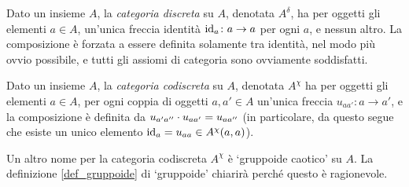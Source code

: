 \begin{example}\label{ex_cat_discreta}
 Dato un insieme \(A\), la \emph{categoria discreta} su \(A\), denotata \(A^\delta\), ha per oggetti gli elementi \(a\in A\), un'unica freccia identità \(\mathrm{id}_a \colon a\to a\) per ogni \(a\), e nessun altro. La composizione è forzata a essere definita solamente tra identità, nel modo più ovvio possibile, e tutti gli assiomi di categoria sono ovviamente soddisfatti.
\end{example}
\begin{example}\label{ex_cat_codiscreta}
 Dato un insieme \(A\), la \emph{categoria codiscreta} su \(A\), denotata \(A^\chi\) ha per oggetti gli elementi \(a\in A\), per ogni coppia di oggetti \(a,a'\in A\) un'unica freccia \(u_{aa'}\colon a\to a'\), e la composizione è definita da \(u_{a'a''}\cdot u_{aa'}=u_{aa''}\) (in particolare, da questo segue che esiste un unico elemento \(\mathrm{id}_a=u_{aa}\in A^\chi(a,a)\)).
\end{example}
Un altro nome per la categoria codiscreta $A^\chi$ è `gruppoide caotico' su $A$. La definizione \ref{def_gruppoide} di `gruppoide' chiarirà perché questo è ragionevole.

